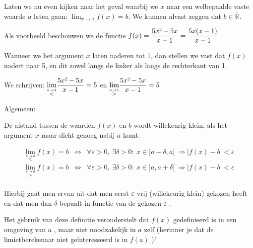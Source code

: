 Laten we nu even kijken naar het geval waarbij we $x$ naar een welbepaalde
vaste waarde $a$ laten gaan: ${\displaystyle \lim_{x\to a}}f(x)=b$.
We kunnen alvast zeggen dat $b\in\overline{\mathbb{R}}$.

\begin{voorbeeld}
	Als voorbeeld beschouwen we de functie $f(x)={\displaystyle \frac{5x\text{\texttwosuperior}-5x}{x-1}}={\displaystyle \frac{5x(x-1)}{x-1}}$ 


\begin{figure}[H]
\centering

\end{figure}


Wanneer we het argument $x$ laten naderen tot 1, dan stellen
we vast dat $f(x)$ nadert naar 5, en dit zowel langs de linker als
langs de rechterkant van 1.

We schrijven: ${\displaystyle \lim_{\overset{x\rightarrow1}{<}}}{\displaystyle \frac{5x\text{\texttwosuperior}-5x}{x-1}}=5$
en ${\displaystyle \lim_{\overset{x\rightarrow1}{>}}}{\displaystyle \frac{5x\text{\texttwosuperior}-5x}{x-1}}=5$ 

\end{voorbeeld}

Algemeen:

De afstand tussen de waarden $f(x)$ en $b$ wordt willekeurig klein,
als het argument $x$ maar dicht genoeg nabij $a$ komt.

\begin{eqnarray*}
{\displaystyle \lim_{\overset{x\rightarrow a}{<}}}f(x)=b & \Leftrightarrow & \forall\varepsilon>0,\:\exists\delta>0:\:x\in]a-\delta,a[\:\Rightarrow\left|f(x)-b\right|<\varepsilon\\
{\displaystyle \lim_{\overset{x\rightarrow a}{>}}}f(x)=b & \Leftrightarrow & \forall\varepsilon>0,\:\exists\delta>0:\:x\in]a,a+\delta[\:\Rightarrow\left|f(x)-b\right|<\varepsilon\\
\end{eqnarray*}

Hierbij gaat men ervan uit dat men eerst $\varepsilon$ vrij (willekeurig
klein) gekozen heeft en dat men dan $\delta$ bepaalt in functie van
de gekozen $\varepsilon$ .

Het gebruik van deze definitie veronderstelt dat $f(x)$ gedefinieerd
is in een omgeving van $a$ , maar niet noodzakelijk in $a$ zelf
(herinner je dat de limietberekenaar niet ge\"interesseerd is in $f(a)$
)! 

